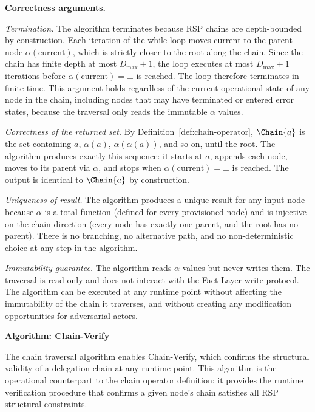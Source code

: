 \medskip
\noindent\textbf{Correctness arguments.}

\textit{Termination.} The algorithm terminates because RSP chains are depth-bounded by construction. Each iteration of the while-loop moves $\text{current}$ to the parent node $\alpha(\text{current})$, which is strictly closer to the root along the chain. Since the chain has finite depth at most $D_{\max} + 1$, the loop executes at most $D_{\max} + 1$ iterations before $\alpha(\text{current}) = \bot$ is reached. The loop therefore terminates in finite time. This argument holds regardless of the current operational state of any node in the chain, including nodes that may have terminated or entered error states, because the traversal only reads the immutable $\alpha$ values.

\textit{Correctness of the returned set.} By Definition~\ref{def:chain-operator}, $\Chain{a}$ is the set containing $a$, $\alpha(a)$, $\alpha(\alpha(a))$, and so on, until the root. The algorithm produces exactly this sequence: it starts at $a$, appends each node, moves to its parent via $\alpha$, and stops when $\alpha(\text{current}) = \bot$ is reached. The output is identical to $\Chain{a}$ by construction.

\textit{Uniqueness of result.} The algorithm produces a unique result for any input node because $\alpha$ is a total function (defined for every provisioned node) and is injective on the chain direction (every node has exactly one parent, and the root has no parent). There is no branching, no alternative path, and no non-deterministic choice at any step in the algorithm.

\textit{Immutability guarantee.} The algorithm reads $\alpha$ values but never writes them. The traversal is read-only and does not interact with the Fact Layer write protocol. The algorithm can be executed at any runtime point without affecting the immutability of the chain it traverses, and without creating any modification opportunities for adversarial actors.

\medskip
\noindent\textbf{Algorithm: Chain-Verify}

The chain traversal algorithm enables Chain-Verify, which confirms the structural validity of a delegation chain at any runtime point. This algorithm is the operational counterpart to the chain operator definition: it provides the runtime verification procedure that confirms a given node's chain satisfies all RSP structural constraints.

